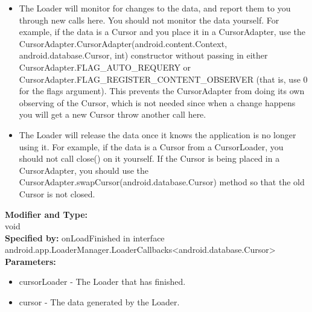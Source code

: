 \begin{itemize}
\item The Loader will monitor for changes to the data, and report them to you through new calls here. You should not monitor the data yourself. For example, if the data is a Cursor and you place it in a CursorAdapter, use the CursorAdapter.CursorAdapter(android.content.Context, android.database.Cursor, int) constructor without passing in either CursorAdapter.FLAG\_AUTO\_REQUERY or CursorAdapter.FLAG\_REGISTER\_CONTENT\_OBSERVER (that is, use 0 for the flags argument). This prevents the CursorAdapter from doing its own observing of the Cursor, which is not needed since when a change happens you will get a new Cursor throw another call here. 
\item The Loader will release the data once it knows the application is no longer using it. For example, if the data is a Cursor from a CursorLoader, you should not call close() on it yourself. If the Cursor is being placed in a CursorAdapter, you should use the CursorAdapter.swapCursor(android.database.Cursor) method so that the old Cursor is not closed. 
\end{itemize}

\textbf{Modifier and Type:}\\
\tab void\\

\textbf{Specified by:}
\tab                            onLoadFinished in interface android.app.LoaderManager.LoaderCallbacks<android.database.Cursor>\\


\textbf{Parameters:}
\begin{itemize}
\item cursorLoader - The Loader that has finished.
\item cursor - The data generated by the Loader.
\end{itemize}


